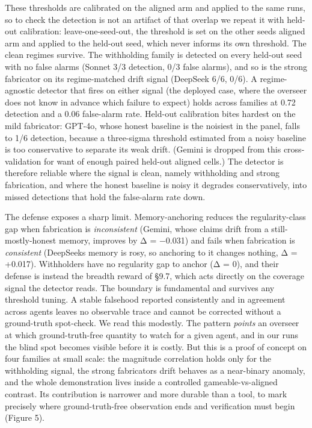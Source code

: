 \documentclass[11pt]{article}
\begin{document}
These thresholds are calibrated on the aligned arm and applied to the
same runs, so to check the detection is not an artifact of that overlap
we repeat it with held-out calibration: leave-one-seed-out, the
threshold is set on the other seeds\textquotesingle{} aligned arm and
applied to the held-out seed, which never informs its own threshold. The
clean regimes survive. The withholding family is detected on every
held-out seed with no false alarms (Sonnet 3/3 detection, 0/3 false
alarms), and so is the strong fabricator on its regime-matched drift
signal (DeepSeek 6/6, 0/6). A regime-agnostic detector that fires on
either signal (the deployed case, where the overseer does not know in
advance which failure to expect) holds across families at 0.72 detection
and a 0.06 false-alarm rate. Held-out calibration bites hardest on the
mild fabricator: GPT-4o, whose honest baseline is the noisiest in the
panel, falls to 1/6 detection, because a three-sigma threshold estimated
from a noisy baseline is too conservative to separate its weak drift.
(Gemini is dropped from this cross-validation for want of enough paired
held-out aligned cells.) The detector is therefore reliable where the
signal is clean, namely withholding and strong fabrication, and where the
honest baseline is noisy it degrades conservatively, into missed
detections that hold the false-alarm rate down.

The defense exposes a sharp limit. Memory-anchoring reduces the
regularity-class gap when fabrication is \emph{inconsistent} (Gemini,
whose claims drift from a still-mostly-honest memory, improves by Δ =
−0.031) and fails when fabrication is \emph{consistent}
(DeepSeek\textquotesingle s memory is rosy, so anchoring to it changes
nothing, Δ = +0.017). Withholders have no regularity gap to anchor (Δ =
0), and their defense is instead the breadth reward of §9.7, which acts
directly on the coverage signal the detector reads. The boundary is
fundamental and survives any threshold tuning. A stable falsehood reported
consistently and in agreement across agents leaves no observable trace
and cannot be corrected without a ground-truth spot-check. We read this
modestly. The pattern \emph{points} an overseer at which
ground-truth-free quantity to watch for a given agent, and in our runs
the blind spot becomes visible before it is costly. But this is a proof
of concept on four families at small scale: the magnitude correlation
holds only for the withholding
signal, the strong fabricator\textquotesingle s drift behaves as a
near-binary anomaly, and the whole
demonstration lives inside a controlled gameable-vs-aligned contrast.
Its contribution is narrower and more durable than a tool, to mark
precisely where ground-truth-free observation ends and verification must
begin (Figure 5).
\end{document}
